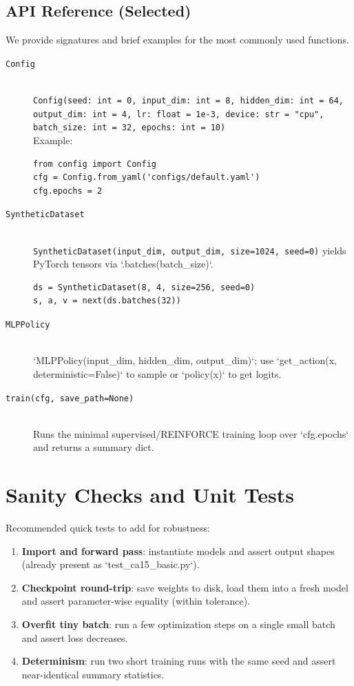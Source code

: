 \documentclass[11pt,a4paper]{article}
\begin{document}
\subsection{API Reference (Selected)}
We provide signatures and brief examples for the most commonly used functions.

\begin{description}
  \item[\texttt{Config}] \hfill \\
  \texttt{Config(seed: int = 0, input\_dim: int = 8, hidden\_dim: int = 64, output\_dim: int = 4, lr: float = 1e-3, device: str = "cpu", batch\_size: int = 32, epochs: int = 10)} \\
  Example:
  \begin{lstlisting}
from config import Config
cfg = Config.from_yaml('configs/default.yaml')
cfg.epochs = 2
  \end{lstlisting}

  \item[\texttt{SyntheticDataset}] \hfill \\
  \texttt{SyntheticDataset(input\_dim, output\_dim, size=1024, seed=0)} yields PyTorch tensors via `.batches(batch\_size)`.
  \begin{lstlisting}
ds = SyntheticDataset(8, 4, size=256, seed=0)
s, a, v = next(ds.batches(32))
  \end{lstlisting}

  \item[\texttt{MLPPolicy}] \hfill \\
  `MLPPolicy(input_dim, hidden_dim, output_dim)`; use `get_action(x, deterministic=False)` to sample or `policy(x)` to get logits.

  \item[\texttt{train(cfg, save_path=None)}] \hfill \\
  Runs the minimal supervised/REINFORCE training loop over `cfg.epochs` and returns a summary dict.
\end{description}

\section{Sanity Checks and Unit Tests}
Recommended quick tests to add for robustness:
\begin{enumerate}
  \item \textbf{Import and forward pass}: instantiate models and assert output shapes (already present as `test_ca15_basic.py`).
  \item \textbf{Checkpoint round-trip}: save weights to disk, load them into a fresh model and assert parameter-wise equality (within tolerance).
  \item \textbf{Overfit tiny batch}: run a few optimization steps on a single small batch and assert loss decreases.
  \item \textbf{Determinism}: run two short training runs with the same seed and assert near-identical summary statistics.
\end{enumerate}
\end{document}
